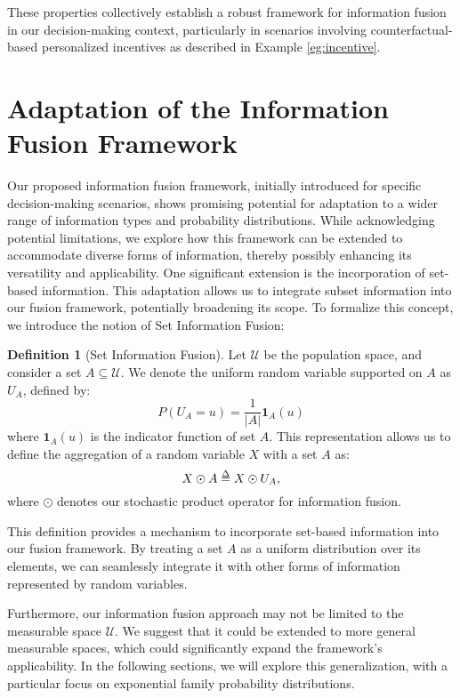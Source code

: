 \documentclass[letterpaper]{article} %
\theoremstyle{definition}
\newtheorem{definition}[theorem]{Definition}
\theoremstyle{remark}
\def\delequal{\mathrel{\ensurestackMath{\stackon[1pt]{=}{\scriptstyle\Delta}}}}
\begin{document}
These properties collectively establish a robust framework for information fusion in our decision-making context, particularly in scenarios involving counterfactual-based personalized incentives as described in Example \ref{eg:incentive}.

\section{Adaptation of the Information Fusion Framework}

Our proposed information fusion framework, initially introduced for specific decision-making scenarios, shows promising potential for adaptation to a wider range of information types and probability distributions. While acknowledging potential limitations, we explore how this framework can be extended to accommodate diverse forms of information, thereby possibly enhancing its versatility and applicability.
One significant extension is the incorporation of set-based information. This adaptation allows us to integrate subset information into our fusion framework, potentially broadening its scope. To formalize this concept, we introduce the notion of Set Information Fusion:
\begin{definition}[Set Information Fusion]
Let $\mathcal{U}$ be the population space, and consider a set $A \subseteq \mathcal{U}$. We denote the uniform random variable supported on $A$ as $U_A$, defined by:
\begin{equation}
P(U_A = u) = \frac{1}{|A|} \mathbf{1}_{A}(u)
\end{equation}
where $\mathbf{1}_{A}(u)$ is the indicator function of set $A$. This representation allows us to define the aggregation of a random variable $X$ with a set $A$ as:
\begin{equation}
X \odot A \delequal X \odot U_A,
\end{equation}
where $\odot$ denotes our stochastic product operator for information fusion.
\end{definition}
This definition provides a mechanism to incorporate set-based information into our fusion framework. By treating a set $A$ as a uniform distribution over its elements, we can seamlessly integrate it with other forms of information represented by random variables.


Furthermore, our information fusion approach may not be limited to the measurable space $\mathcal{U}$. We suggest that it could be extended to more general measurable spaces, which could significantly expand the framework's applicability. In the following sections, we will explore this generalization, with a particular focus on exponential family probability distributions. 
\end{document}
